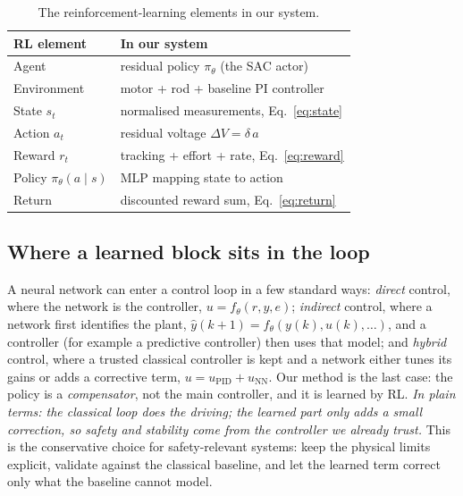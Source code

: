 \documentclass[10pt,twocolumn]{article}
\newcommand{\eli}[1]{\textit{In plain terms: #1}}
\begin{document}
\begin{table}[h]
\centering
\caption{The reinforcement-learning elements in our system.}
\label{tab:rl}
\small
\begin{tabular}{ll}
\toprule
\textbf{RL element} & \textbf{In our system}\\
\midrule
Agent                        & residual policy $\pi_\theta$ (the SAC actor)\\
Environment                  & motor + rod + baseline PI controller\\
State $s_t$                  & normalised measurements, Eq.~\eqref{eq:state}\\
Action $a_t$                 & residual voltage $\Delta V=\delta\,a$\\
Reward $r_t$                 & tracking + effort + rate, Eq.~\eqref{eq:reward}\\
Policy $\pi_\theta(a\mid s)$ & MLP mapping state to action\\
Return                       & discounted reward sum, Eq.~\eqref{eq:return}\\
\bottomrule
\end{tabular}
\end{table}

\subsection{Where a learned block sits in the loop}
A neural network can enter a control loop in a few standard ways:
\emph{direct} control, where the network is the controller,
$u=f_\theta(r,y,e)$; \emph{indirect} control, where a network first
identifies the plant, $\hat y(k{+}1)=f_\theta(y(k),u(k),\dots)$, and a
controller (for example a predictive controller) then uses that model;
and \emph{hybrid} control, where a trusted classical controller is kept
and a network either tunes its gains or adds a corrective term,
$u=u_{\mathrm{PID}}+u_{\mathrm{NN}}$. Our method is the last case: the
policy is a \emph{compensator}, not the main controller, and it is
learned by RL.
\eli{the classical loop does the driving; the learned part only adds a
small correction, so safety and stability come from the controller we
already trust.}
This is the conservative choice for safety-relevant systems: keep the
physical limits explicit, validate against the classical baseline, and
let the learned term correct only what the baseline cannot model.
\end{document}
